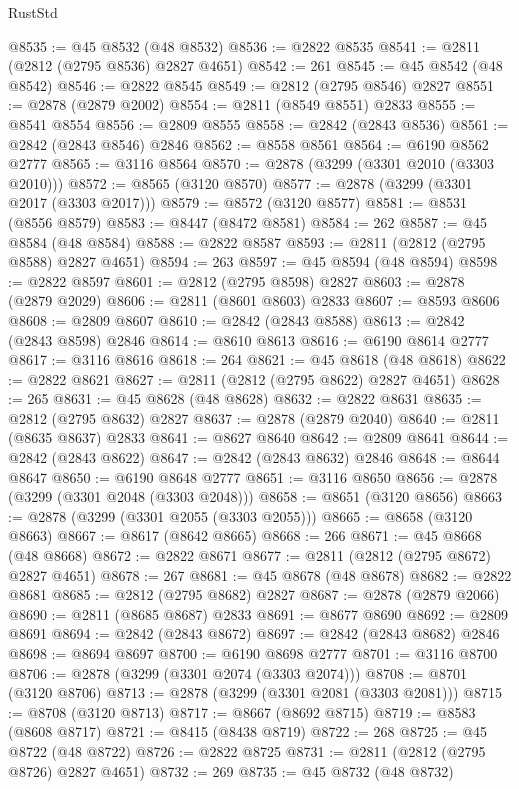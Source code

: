\begin{lexlean}{RustStd}
\begin{coremodule}
@8535 := @45 @8532 (@48 @8532)
@8536 := @2822 @8535
@8541 := @2811 (@2812 (@2795 @8536) @2827 @4651)
@8542 := 261
@8545 := @45 @8542 (@48 @8542)
@8546 := @2822 @8545
@8549 := @2812 (@2795 @8546) @2827
@8551 := @2878 (@2879 @2002)
@8554 := @2811 (@8549 @8551) @2833
@8555 := @8541 @8554
@8556 := @2809 @8555
@8558 := @2842 (@2843 @8536)
@8561 := @2842 (@2843 @8546) @2846
@8562 := @8558 @8561
@8564 := @6190 @8562 @2777
@8565 := @3116 @8564
@8570 := @2878 (@3299 (@3301 @2010 (@3303 @2010)))
@8572 := @8565 (@3120 @8570)
@8577 := @2878 (@3299 (@3301 @2017 (@3303 @2017)))
@8579 := @8572 (@3120 @8577)
@8581 := @8531 (@8556 @8579)
@8583 := @8447 (@8472 @8581)
@8584 := 262
@8587 := @45 @8584 (@48 @8584)
@8588 := @2822 @8587
@8593 := @2811 (@2812 (@2795 @8588) @2827 @4651)
@8594 := 263
@8597 := @45 @8594 (@48 @8594)
@8598 := @2822 @8597
@8601 := @2812 (@2795 @8598) @2827
@8603 := @2878 (@2879 @2029)
@8606 := @2811 (@8601 @8603) @2833
@8607 := @8593 @8606
@8608 := @2809 @8607
@8610 := @2842 (@2843 @8588)
@8613 := @2842 (@2843 @8598) @2846
@8614 := @8610 @8613
@8616 := @6190 @8614 @2777
@8617 := @3116 @8616
@8618 := 264
@8621 := @45 @8618 (@48 @8618)
@8622 := @2822 @8621
@8627 := @2811 (@2812 (@2795 @8622) @2827 @4651)
@8628 := 265
@8631 := @45 @8628 (@48 @8628)
@8632 := @2822 @8631
@8635 := @2812 (@2795 @8632) @2827
@8637 := @2878 (@2879 @2040)
@8640 := @2811 (@8635 @8637) @2833
@8641 := @8627 @8640
@8642 := @2809 @8641
@8644 := @2842 (@2843 @8622)
@8647 := @2842 (@2843 @8632) @2846
@8648 := @8644 @8647
@8650 := @6190 @8648 @2777
@8651 := @3116 @8650
@8656 := @2878 (@3299 (@3301 @2048 (@3303 @2048)))
@8658 := @8651 (@3120 @8656)
@8663 := @2878 (@3299 (@3301 @2055 (@3303 @2055)))
@8665 := @8658 (@3120 @8663)
@8667 := @8617 (@8642 @8665)
@8668 := 266
@8671 := @45 @8668 (@48 @8668)
@8672 := @2822 @8671
@8677 := @2811 (@2812 (@2795 @8672) @2827 @4651)
@8678 := 267
@8681 := @45 @8678 (@48 @8678)
@8682 := @2822 @8681
@8685 := @2812 (@2795 @8682) @2827
@8687 := @2878 (@2879 @2066)
@8690 := @2811 (@8685 @8687) @2833
@8691 := @8677 @8690
@8692 := @2809 @8691
@8694 := @2842 (@2843 @8672)
@8697 := @2842 (@2843 @8682) @2846
@8698 := @8694 @8697
@8700 := @6190 @8698 @2777
@8701 := @3116 @8700
@8706 := @2878 (@3299 (@3301 @2074 (@3303 @2074)))
@8708 := @8701 (@3120 @8706)
@8713 := @2878 (@3299 (@3301 @2081 (@3303 @2081)))
@8715 := @8708 (@3120 @8713)
@8717 := @8667 (@8692 @8715)
@8719 := @8583 (@8608 @8717)
@8721 := @8415 (@8438 @8719)
@8722 := 268
@8725 := @45 @8722 (@48 @8722)
@8726 := @2822 @8725
@8731 := @2811 (@2812 (@2795 @8726) @2827 @4651)
@8732 := 269
@8735 := @45 @8732 (@48 @8732)

\end{coremodule}
\end{lexlean}
